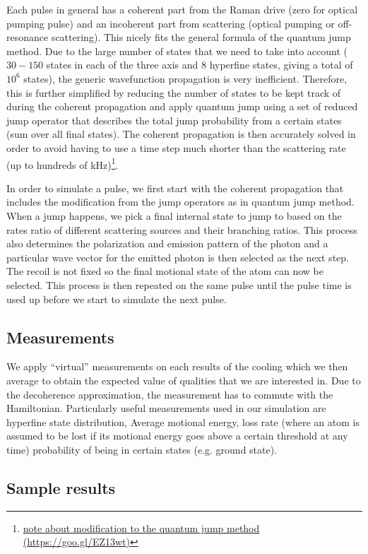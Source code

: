 \documentclass[aps,twocolumn,secnumarabic,balancelastpage,amsmath,amssymb]{revtex4}
\begin{document}
Each pulse in general has a coherent part from the Raman drive (zero for optical pumping pulse)
and an incoherent part from scattering (optical pumping or off-resonance scattering).
This nicely fits the general formula of the quantum jump method. Due to the large number of
states that we need to take into account ($30-150$ states in each of the three axis and
$8$ hyperfine states, giving a total of $10^6$ states),
the generic wavefunction propagation is very inefficient.
Therefore, this is further simplified by reducing the number of states to be kept track of during
the coherent propagation and apply quantum jump using a set of reduced jump operator that
describes the total jump probability from a certain states (sum over all final states).
The coherent propagation is then accurately solved in order to avoid having to use a time step
much shorter than the scattering rate (up to hundreds of kHz)\footnote{\href{https://goo.gl/EZ13wt}{note about modification to the quantum jump method (https://goo.gl/EZ13wt)}}.

In order to simulate a pulse, we first start with the coherent propagation that includes the
modification from the jump operators as in quantum jump method.
When a jump happens, we pick a final internal state to jump to based on the rates ratio
of different scattering sources and their branching ratios.
This process also determines the polarization and emission pattern of the photon and
a particular wave vector for the emitted photon is then selected as the next step.
The recoil is not fixed so the final motional state of the atom can now be selected.
This process is then repeated on the same pulse until the pulse time is used up before
we start to simulate the next pulse.

\subsection{Measurements}

We apply ``virtual'' measurements on each results of the cooling which we then average to
obtain the expected value of qualities that we are interested in.
Due to the decoherence approximation, the measurement has to commute with the Hamiltonian.
Particularly useful measurements used in our simulation are hyperfine state distribution,
Average motional energy, loss rate (where an atom is assumed to be lost if its motional energy
goes above a certain threshold at any time) probability of being in certain states
(e.g. ground state).

\subsection{Sample results}
\end{document}
